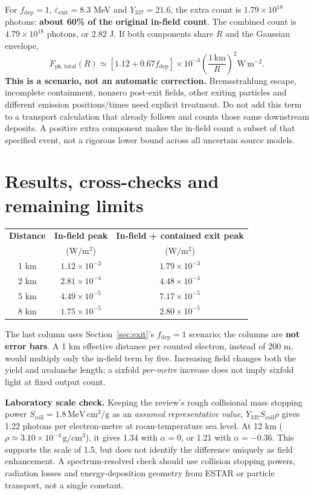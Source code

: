 \documentclass[11pt,a4paper]{article}
\newcommand{\unitsflux}{\mathrm{W\,m^{-2}}}
\begin{document}
For $f_{\mathrm{dep}}=1$, $\overline{\varepsilon}_{\mathrm{exit}}=8.3$ MeV and $Y_{337}=21.6$, the extra count is $1.79\times10^{18}$ photons: \textbf{about 60\% of the original in-field count}. The combined count is $4.79\times10^{18}$ photons, or $2.82$ J. If both components share $R$ and the Gaussian envelope,
\begin{equation}
\boxed{F_{\mathrm{pk,total}}(R)\simeq
[1.12+0.67f_{\mathrm{dep}}]\times10^{-3}
\left(\frac{1\,\mathrm{km}}{R}\right)^2\unitsflux.}
\end{equation}
\textbf{This is a scenario, not an automatic correction.} Bremsstrahlung escape, incomplete containment, nonzero post-exit fields, other exiting particles and different emission positions/times need explicit treatment. Do not add this term to a transport calculation that already follows and counts those same downstream deposits. A positive extra component makes the in-field count a subset of that specified event, not a rigorous lower bound across all uncertain source models.

\clearpage
\section{Results, cross-checks and remaining limits}\label{sec:checks}
\begin{center}
\begin{tabular}{@{}ccc@{}}
\toprule
\textbf{Distance} & \textbf{In-field peak} & \textbf{In-field + contained exit peak}\\
 & ($\mathrm{W/m^2}$) & ($\mathrm{W/m^2}$)\\
\midrule
1 km & $1.12\times10^{-3}$ & $1.79\times10^{-3}$\\
2 km & $2.81\times10^{-4}$ & $4.48\times10^{-4}$\\
5 km & $4.49\times10^{-5}$ & $7.17\times10^{-5}$\\
8 km & $1.75\times10^{-5}$ & $2.80\times10^{-5}$\\
\bottomrule
\end{tabular}
\end{center}
The last column uses Section~\ref{sec:exit}'s $f_{\mathrm{dep}}=1$ scenario; the columns are \textbf{not error bars}. A 1 km effective distance per counted electron, instead of 200 m, would multiply only the in-field term by five. Increasing field changes both the yield and avalanche length; a sixfold \emph{per-metre} increase does not imply sixfold light at fixed output count.

\textbf{Laboratory scale check.} Keeping the review's rough collisional mass stopping power $S_{\mathrm{coll}}=1.8\,\mathrm{MeV\,cm^2/g}$ as an \emph{assumed representative value}, $Y_{337}S_{\mathrm{coll}}\rho$ gives 1.22 photons per electron-metre at room-temperature sea level. At 12 km ($\rho\simeq3.10\times10^{-4}\,\mathrm{g/cm^3}$), it gives 1.34 with $\alpha=0$, or 1.21 with $\alpha=-0.36$. This supports the scale of 1.5, but does not identify the difference uniquely as field enhancement. A spectrum-resolved check should use collision stopping powers, radiation losses and energy-deposition geometry from ESTAR or particle transport, not a single constant.~\cite{AIRFLY2013,NIST}
\end{document}
